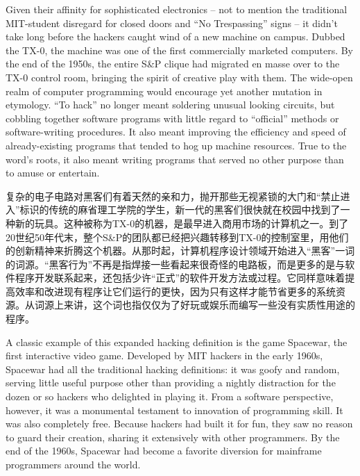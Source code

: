 \ifdefined\eng
Given their affinity for sophisticated electronics -- not to mention the traditional MIT-student disregard for closed doors and ``No Trespassing'' signs -- it didn't take long before the hackers caught wind of a new machine on campus. Dubbed the TX-0, the machine was one of the first commercially marketed computers. By the end of the 1950s, the entire S\&P clique had migrated en masse over to the TX-0 control room, bringing the spirit of creative play with them. The wide-open realm of computer programming would encourage yet another mutation in etymology. ``To hack'' no longer meant soldering unusual looking circuits, but cobbling together software programs with little regard to ``official'' methods or software-writing procedures. It also meant improving the efficiency and speed of already-existing programs that tended to hog up machine resources. True to the word's roots, it also meant writing programs that served no other purpose than to amuse or entertain.
\fi

\ifdefined\chs
复杂的电子电路对黑客们有着天然的亲和力，抛开那些无视紧锁的大门和“禁止进入”标识的传统的麻省理工学院的学生，新一代的黑客们很快就在校园中找到了一种新的玩具。这种被称为TX-0的机器，是最早进入商用市场的计算机之一。到了20世纪50年代末，整个S\&P的团队都已经把兴趣转移到TX-0的控制室里，用他们的创新精神来折腾这个机器。从那时起，计算机程序设计领域开始进入“黑客”一词的词源。“黑客行为”不再是指焊接一些看起来很奇怪的电路板，而是更多的是与软件程序开发联系起来，还包括少许“正式”的软件开发方法或过程。它同样意味着提高效率和改进现有程序让它们运行的更快，因为只有这样才能节省更多的系统资源。从词源上来讲，这个词也指仅仅为了好玩或娱乐而编写一些没有实质性用途的程序。
\fi

\ifdefined\eng
A classic example of this expanded hacking definition is the game Spacewar, the first interactive video game. Developed by MIT hackers in the early 1960s, Spacewar had all the traditional hacking definitions: it was goofy and random, serving little useful purpose other than providing a nightly distraction for the dozen or so hackers who delighted in playing it. From a software perspective, however, it was a monumental testament to innovation of programming skill. It was also completely free. Because hackers had built it for fun, they saw no reason to guard their creation, sharing it extensively with other programmers. By the end of the 1960s, Spacewar had become a favorite diversion for mainframe programmers around the world. %
\fi

